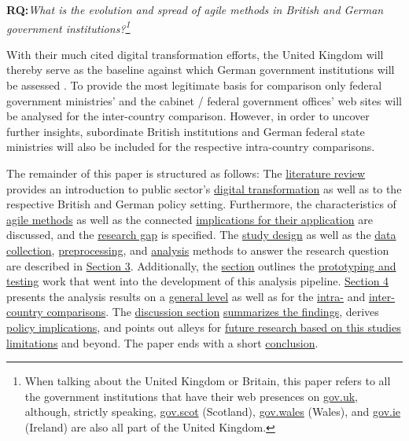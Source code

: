 \begin{addmargin}[2em]{2em}%
\textbf{RQ:}\textit{What is the evolution and spread of agile methods in British and German government institutions?\footnote{When talking about the United Kingdom or Britain, this paper refers to all the government institutions that have their web presences on \href{https://gov.uk}{gov.uk}, although, strictly speaking, \href{https://gov.scot}{gov.scot} (Scotland), \href{https://gov.wales}{gov.wales} (Wales), and  \href{https://gov.ie}{gov.ie} (Ireland) are also all part of the United Kingdom.}}\label{RQ1}
\end{addmargin}\par 

With their much cited digital transformation efforts, the United Kingdom will thereby serve as the baseline against which German government institutions will be assessed \parencite{Sivarajah2014, Clarke2019}. To provide the most legitimate basis for comparison only federal government ministries' and the cabinet / federal government offices' web sites will be analysed for the inter-country comparison. However, in order to uncover further insights, subordinate British institutions and German federal state ministries will also be included for the respective intra-country comparisons.


The remainder of this paper is structured as follows: The \hyperref[Literature Review]{literature review} provides an introduction to public sector's \hyperref[Digital Transformation]{digital transformation} as well as to the respective British and German policy setting. Furthermore, the characteristics of \hyperref[Agile Methods]{agile methods} as well as the connected \hyperref[Benefits, Challenges, and Conditions]{implications for their application} are discussed, and the \hyperref[Research Gap]{research gap} is specified. The 
\hyperref[Study Design]{study design} as well as the \hyperref[Data Collection]{data collection}, \hyperref[Data Preprocessing]{preprocessing}, and \hyperref[Data Analysis and Visualisation]{analysis} methods to answer the research question are described in \hyperref[Methods]{Section 3}. Additionally, the \hyperref[Methods]{section} outlines the \hyperref[Prototyping and Testing]{prototyping and testing} work that went into the development of this analysis pipeline. \hyperref[Analysis]{Section 4} presents the analysis results on a \hyperref[General Level]{general level} as well as for the \hyperref[Intra-Country Comparison]{intra-} and \hyperref[Inter-Country Comparison]{inter-country comparisons}. The \hyperref[Discussion]{discussion section} \hyperref[Summary of Findings]{summarizes the findings}, derives \hyperref[Policy Implications]{policy implications}, and points out alleys for \hyperref[Limitations and Future Work]{future research based on this studies limitations} and beyond. The paper ends with a short \hyperref[Conclusion]{conclusion}.



